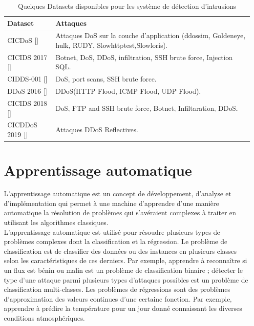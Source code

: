 \begin{table}[h]
\begin{center}
\begin{tabular}{   m{4cm} | m{10cm}  }
\textbf{Dataset} & \textbf{Attaques}\\
\hline
\rowcolor[rgb]{0.85,0.85,0.85}
CICDoS [\cite{16}]  & Attaques DoS sur la couche d'application (ddossim, Goldeneye, hulk, RUDY, Slowhttptest,Slowloris).\\
\hline
CICIDS 2017 [\cite{17}] & Botnet, DoS, DDoS, infiltration, SSH brute force, Injection SQL.\\
\hline
\rowcolor[rgb]{0.85,0.85,0.85}
CIDDS-001 [\cite{18}] & DoS, port scans, SSH brute force.\\
\hline
DDoS 2016 [\cite{19}] & DDoS(HTTP Flood, ICMP Flood, UDP Flood).\\
\hline 
\rowcolor[rgb]{0.85,0.85,0.85}
CICIDS 2018 [\cite{20}] & DoS, FTP and SSH brute force, Botnet, Infiltaration, DDoS.\\
\hline
CICDDoS 2019 [\cite{21}] & Attaques DDoS Reflectives.\\
\hline
\end{tabular}
\caption{Quelques Datasets disponibles pour les système de détection d'intrusions}
\end{center}
\label{table:Datasets}
\end{table}


\newpage
\section{Apprentissage automatique}
L’apprentissage automatique est un concept de développement, d’analyse et d’implémentation qui permet à une machine d’apprendre d’une manière automatique la résolution de problèmes qui s’avéraient complexes à traiter en utilisant les algorithmes classiques.\\

\noindent L’apprentissage automatique est utilisé pour résoudre plusieurs types de problèmes complexes dont la classification et la régression. Le problème de classification est de classifier des données ou des instances en plusieurs classes selon les caractéristiques de ces derniers. Par exemple, apprendre à reconnaître si un flux est bénin ou malin est un problème de classification binaire ; détecter le type d’une attaque parmi plusieurs types d’attaques possibles est un problème de classification multi-classes. Les problèmes de régressions sont des problèmes d’approximation des valeurs continues d’une certaine fonction. Par exemple, apprendre à prédire la température pour un jour donné connaissant les diverses conditions atmosphériques.\\

